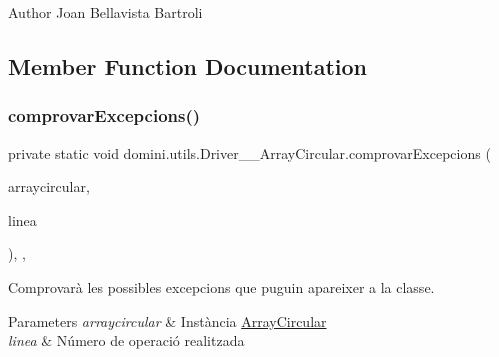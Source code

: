 \begin{DoxyAuthor}{Author}
Joan Bellavista Bartroli 
\end{DoxyAuthor}


\subsection{Member Function Documentation}
\mbox{\label{classdomini_1_1utils_1_1Driver____ArrayCircular_a0f5f42c5ace9176cfcae4dfe9717f380}} 
\subsubsection{\texorpdfstring{comprovar\+Excepcions()}{comprovarExcepcions()}}
{\footnotesize\ttfamily private static void domini.\+utils.\+Driver\+\_\+\+\_\+\+Array\+Circular.\+comprovar\+Excepcions (\begin{DoxyParamCaption}\item[{\hyperlink{classdomini_1_1utils_1_1ArrayCircular}{Array\+Circular}}]{arraycircular,  }\item[{String}]{linea }\end{DoxyParamCaption})\hspace{0.3cm}{\ttfamily [inline]}, {\ttfamily [static]}, {\ttfamily [private]}}



Comprovarà les possibles excepcions que puguin apareixer a la classe. 


\begin{DoxyParams}{Parameters}
{\em arraycircular} & Instància \hyperlink{classdomini_1_1utils_1_1ArrayCircular}{Array\+Circular} \\
\hline
{\em linea} & Número de operació realitzada \\
\hline
\end{DoxyParams}
\mbox{\label{classdomini_1_1utils_1_1Driver____ArrayCircular_adf8b1dedd521248da8a5f1425dd27af8}} 
